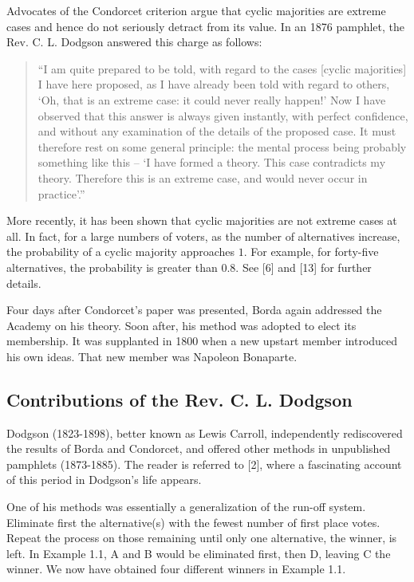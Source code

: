 \documentclass{article}
\begin{document}
Advocates of the Condorcet criterion argue that cyclic majorities are extreme cases and hence do not seriously detract from its value. In an 1876 pamphlet, the Rev. C. L. Dodgson answered this charge as follows:

\begin{quote}
``I am quite prepared to be told, with regard to the cases [cyclic majorities] I have here proposed, as I have already been told with regard to others, `Oh, that is an extreme case: it could never really happen!' Now I have observed that this answer is always given instantly, with perfect confidence, and without any examination of the details of the proposed case. It must therefore rest on some general principle: the mental process being probably something like this -- `I have formed a theory. This case contradicts my theory. Therefore this is an extreme case, and would never occur in practice'.''
\end{quote}

More recently, it has been shown that cyclic majorities are not extreme cases at all. In fact, for a large numbers of voters, as the number of alternatives increase, the probability of a cyclic majority approaches $1$. For example, for forty-five alternatives, the probability is greater than $0.8$. See [6] and [13] for further details.

Four days after Condorcet's paper was presented, Borda again addressed the Academy on his theory. Soon after, his method was adopted to elect its membership. It was supplanted in 1800 when a new upstart member introduced his own ideas. That new member was Napoleon Bonaparte.


\subsection*{Contributions of the Rev. C. L. Dodgson}

Dodgson (1823-1898), better known as Lewis Carroll, independently rediscovered the results of Borda and Condorcet, and offered other methods in unpublished pamphlets (1873-1885). The reader is referred to [2], where a fascinating account of this period in Dodgson's life appears.

One of his methods was essentially a generalization of the run-off system. Eliminate first the alternative(s) with the fewest number of first place votes. Repeat the process on those remaining until only one alternative, the winner, is left. In Example 1.1, A and B would be eliminated first, then D, leaving C the winner. We now have obtained four different winners in Example 1.1.
\end{document}
